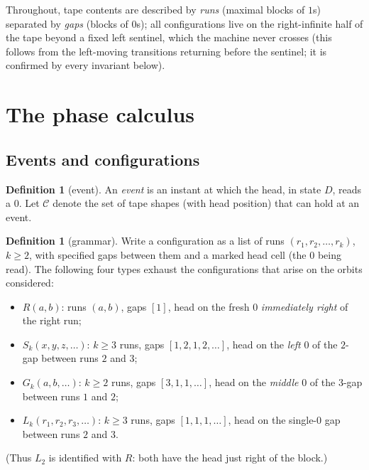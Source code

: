 \documentclass[11pt]{amsart}
\theoremstyle{definition}
\newtheorem{definition}[theorem]{Definition}
\begin{document}
Throughout, tape contents are described by \emph{runs} (maximal blocks of
$1$s) separated by \emph{gaps} (blocks of $0$s); all configurations live on
the right-infinite half of the tape beyond a fixed left sentinel, which the
machine never crosses (this follows from the left-moving transitions
returning before the sentinel; it is confirmed by every invariant below).

\section{The phase calculus}\label{s:phase}

\subsection{Events and configurations}

\begin{definition}[event]
An \emph{event} is an instant at which the head, in state $D$, reads a $0$.
Let $\mathcal{C}$ denote the set of tape shapes (with head position) that
can hold at an event.
\end{definition}

\begin{definition}[grammar]\label{def:grammar}
Write a configuration as a list of runs $(r_1,r_2,\dots,r_k)$,
$k\ge2$, with specified gaps between them and a marked head cell (the $0$
being read). The following four types exhaust the configurations that arise
on the orbits considered:
\begin{itemize}
\item $R(a,b)$: runs $(a,b)$, gaps $[1]$, head on the fresh $0$
\emph{immediately right} of the right run;
\item $S_k(x,y,z,\dots)$: $k\ge3$ runs, gaps $[1,2,1,2,\dots]$, head on the
\emph{left} $0$ of the $2$-gap between runs $2$ and $3$;
\item $G_k(a,b,\dots)$: $k\ge2$ runs, gaps $[3,1,1,\dots]$, head on the
\emph{middle} $0$ of the $3$-gap between runs $1$ and $2$;
\item $L_k(r_1,r_2,r_3,\dots)$: $k\ge3$ runs, gaps $[1,1,1,\dots]$, head on
the single-$0$ gap between runs $2$ and $3$.
\end{itemize}
(Thus $L_2$ is identified with $R$: both have the head just right of the
block.)
\end{definition}
\end{document}
